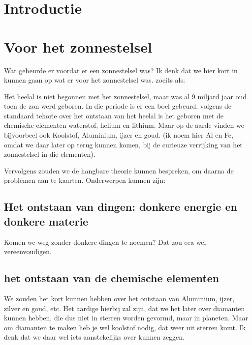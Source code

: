 \documentclass[11pt,fleqn]{book} %
\begin{document}

\pagestyle{fancy} %



\chapter{Introductie}

\chapter{Voor het zonnestelsel}

Wat gebeurde er voordat er een zonnestelsel was? Ik denk dat we hier
kort in kunnen gaan op wat er voor het zonnestelsel was. zoeits als:

Het heelal is niet begonnen met het zonnestelsel, maar was al 9
miljard jaar oud toen de zon werd geboren. In die periode is er een
boel gebeurd. volgens de standaard tehorie over het ontstaan van het
heelal is het geboren met de chemische elementen waterstof, helium en
lithium. Maar op de aarde vinden we bijvoorbeel ook Koolstof,
Aluminium, ijzer en goud. (ik noem hier Al en Fe, omdat we daar later
op terug kunnen komen, bij de curieuze verrijking van het zonnestelsel
in die elementen).

Vervolgens zouden we de hangbare theorie kunnen bespreken, om daarna de problemen aan te kaarten.
Onderwerpen kunnen zijn:
\section{Het ontstaan van dingen: donkere energie en donkere materie}
Komen we weg zonder donkere dingen te noemen? Dat zou eea wel vereenvoudigen.

\section{het ontstaan van de chemische elementen}
We zouden het kort kunnen hebben over het ontstaan van Aluminium,
ijzer, zilver en goud, etc.  Het aardige hierbij zal zijn, dat we het
later over diamanten kunnen hebben, die dus niet in sterren worden
gevormd, maar in planeten. Maar om diamanten te maken heb je wel
koolstof nodig, dat weer uit sterren komt. Ik denk dat we daar wel
iets aanstekelijks over kunnen zeggen.
\end{document}
